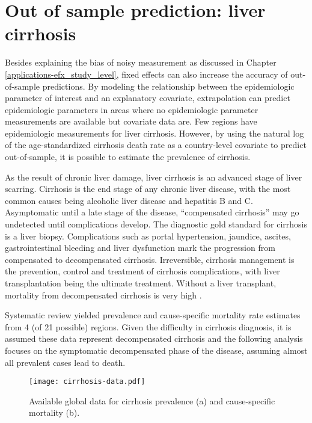 \chapter{Out of sample prediction: liver cirrhosis}
\label{applications-efx_country_level}

Besides explaining the bias of noisy measurement as discussed in Chapter \ref{applications-efx_study_level}, fixed effects can also increase the accuracy of out-of-sample predictions.  By modeling the relationship between the epidemiologic parameter of interest and an explanatory covariate, extrapolation can predict epidemiologic parameters in areas where no epidemiologic parameter measurements are available but covariate data are.  Few regions have epidemiologic measurements for liver cirrhosis.  However, by using the natural log of the age-standardized cirrhosis death rate as a country-level covariate to predict out-of-sample, it is possible to estimate the prevalence of cirrhosis.

As the result of chronic liver damage, liver cirrhosis is an advanced stage of liver scarring.  Cirrhosis is the end stage of any chronic liver disease, with the most common causes being alcoholic liver disease and hepatitis B and C.  Asymptomatic until a late stage of the disease, ``compensated cirrhosis'' may go undetected until complications develop.  The diagnostic gold standard for cirrhosis is a liver biopsy.  Complications such as portal hypertension, jaundice, ascites, gastrointestinal bleeding and liver dysfunction mark the progression from compensated to decompensated cirrhosis.  Irreversible, cirrhosis management is the prevention, control and treatment of cirrhosis complications, with liver transplantation being the ultimate treatment.  Without a liver transplant, mortality from decompensated cirrhosis is very high \cite{garcia-tsao_management_2009, d'amico_natural_2006, schuppan_liver_2008}.

Systematic review yielded prevalence and cause-specific mortality rate estimates from 4 (of 21 possible) regions.  Given the difficulty in cirrhosis diagnosis, it is assumed these data represent decompensated cirrhosis and the following analysis focuses on the symptomatic decompensated phase of the disease, assuming almost all prevalent cases lead to death.

    \begin{figure}[h]
        \begin{center}
            \texttt{[image: cirrhosis-data.pdf]}
            \caption{Available global data for cirrhosis prevalence (a) and cause-specific mortality (b).}
            \label{fig:app-cirrhosis data}
        \end{center}
    \end{figure}


